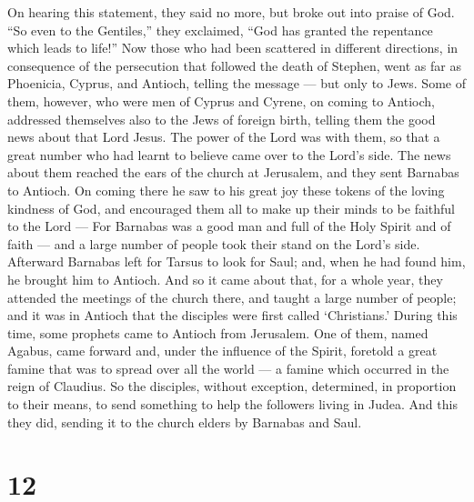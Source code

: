  On hearing this statement, they said no more, but broke
out into praise of God. ``So even to the Gentiles,'' they exclaimed,
``God has granted the repentance which leads to life!'' 
Now those who had been scattered in different directions, in consequence
of the persecution that followed the death of Stephen, went as far as
Phoenicia, Cyprus, and Antioch, telling the message --- but only to
Jews.  Some of them, however, who were men of Cyprus and
Cyrene, on coming to Antioch, addressed themselves also to the Jews of
foreign birth, telling them the good news about that Lord Jesus.
 The power of the Lord was with them, so that a great
number who had learnt to believe came over to the Lord's side.
 The news about them reached the ears of the church at
Jerusalem, and they sent Barnabas to Antioch.  On coming
there he saw to his great joy these tokens of the loving kindness of
God, and encouraged them all to make up their minds to be faithful to
the Lord ---  For Barnabas was a good man and full of the
Holy Spirit and of faith --- and a large number of people took their
stand on the Lord's side.  Afterward Barnabas left for
Tarsus to look for Saul;  and, when he had found him, he
brought him to Antioch. And so it came about that, for a whole year,
they attended the meetings of the church there, and taught a large
number of people; and it was in Antioch that the disciples were first
called `Christians.'  During this time, some prophets came
to Antioch from Jerusalem.  One of them, named Agabus, came
forward and, under the influence of the Spirit, foretold a great famine
that was to spread over all the world --- a famine which occurred in the
reign of Claudius.  So the disciples, without exception,
determined, in proportion to their means, to send something to help the
followers living in Judea.  And this they did, sending it
to the church elders by Barnabas and Saul.

\hypertarget{section-11}{%
\section{12}\label{section-11}}

